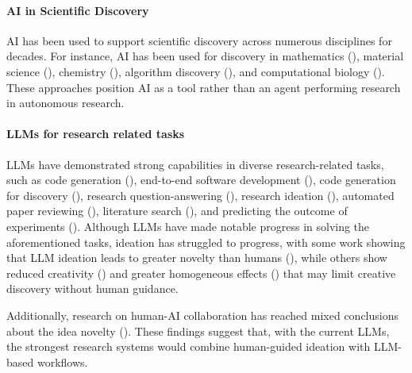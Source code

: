\documentclass[11pt, a4paper]{gdm_format}
\begin{document}
\paragraph{AI in Scientific Discovery}

AI has been used to support scientific discovery across numerous disciplines for decades. For instance, AI has been used for discovery in mathematics (\cite{romera2024mathematical}), material science (\cite{szymanski2023autonomous, pyzer2022accelerating, merchant2023scaling}), chemistry (\cite{jumper2021highly, hayes2024simulating}), algorithm discovery (\cite{fawzi2022discovering}), and computational biology (\cite{ding2024automating}). These approaches position AI as a tool rather than an agent performing research in autonomous research. 


\paragraph{LLMs for research related tasks}

LLMs have demonstrated strong capabilities in diverse research-related tasks, such as code generation (\cite{chen2021evaluating, nijkamp2022codegen}), end-to-end software development (\cite{qian2024chatdev, qian2023experiential, phan2024hyperagent, hai2024repoexec}), code generation for discovery (\cite{majumder2024discoverybench, ifargan2024autonomous, hu2024infiagent, guo2024ds, gu2024blade, ghafarollahi2024protagents, chen2024scienceagentbench}), research question-answering (\cite{chen2024scholarchemqa, lala2023paperqa, song2024cs, lin2024biokgbench}), research ideation (\cite{baek2024researchagent, ghafarollahi2024sciagents, li2024chain, si2024can}), automated paper reviewing (\cite{d2024marg, liang2024can, lu2024aiscientist, weng2024cycleresearcher}), literature search (\cite{ajith2024litsearch, kang2024researcharena, press2024citeme, li2024scilitllm}), and predicting the outcome of experiments (\cite{luo2024large, ashokkumar2024predicting, lehr2024chatgpt, manning2024automated, zhang2024massw}). 
Although LLMs have made notable progress in solving the aforementioned tasks, ideation has struggled to progress, with some work showing that LLM ideation leads to greater novelty than humans (\cite{si2024can}), while others show reduced creativity (\cite{chakrabarty2024art}) and greater homogeneous effects (\cite{anderson2024homogenization, zhou2024shared}) that may limit creative discovery without human guidance.

Additionally, research on human-AI collaboration has reached mixed conclusions about the idea novelty (\cite{ashkinaze2024ai, liu2024ai, padmakumardoes}). These findings suggest that, with the current LLMs, the strongest research systems would combine human-guided ideation with LLM-based workflows. 
\end{document}
